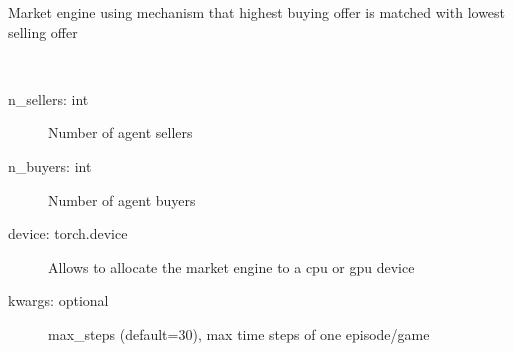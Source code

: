 \documentclass[letterpaper,10pt,english]{sphinxmanual}
\begin{document}
\begin{fulllineitems}
\label{\detokenize{MultiAgentMarketRL:markets.MarketMatchHiLo}}
\sphinxAtStartPar
Market engine using mechanism that highest buying offer is matched with lowest selling offer

\begin{fulllineitems}
\label{\detokenize{MultiAgentMarketRL:markets.MarketMatchHiLo.__init__}}~\begin{description}
\item[{n\_sellers: int}] \leavevmode
\sphinxAtStartPar
Number of agent sellers

\item[{n\_buyers: int}] \leavevmode
\sphinxAtStartPar
Number of agent buyers

\item[{device: torch.device}] \leavevmode
\sphinxAtStartPar
Allows to allocate the market engine to a cpu or gpu device

\item[{kwargs: optional}] \leavevmode
\sphinxAtStartPar
max\_steps (default=30), max time steps of one episode/game

\end{description}

\end{fulllineitems}


\begin{fulllineitems}
\label{\detokenize{MultiAgentMarketRL:markets.MarketMatchHiLo.calculate_deals}}
\end{fulllineitems}


\end{fulllineitems}
\end{document}
